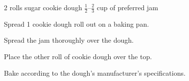 \dishtype{\dessert}
\dishother{\vegetarian}
\begin{ingreds}
    2 rolls sugar cookie dough
    $\frac{1}{2}$--$\frac{2}{3}$ cup of preferred jam
\end{ingreds}
\begin{method}
    Spread 1 cookie dough roll out on a baking pan.\par
    Spread the jam thoroughly over the dough.\par
    Place the other roll of cookie dough over the top.\par
    Bake according to the dough's manufacturer's specifications.
\end{method}